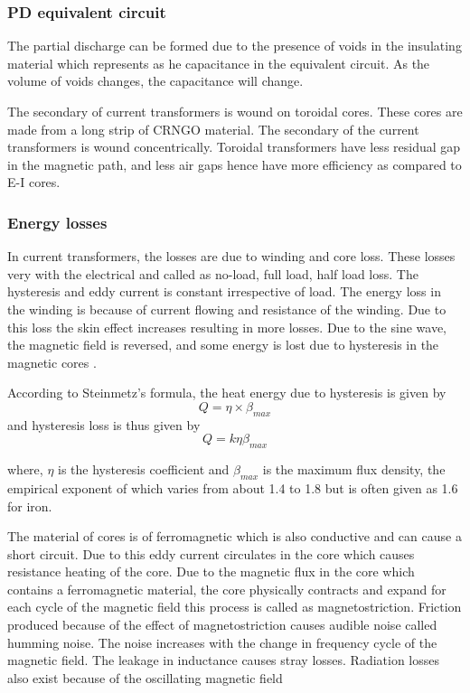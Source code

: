 \subsubsection{PD equivalent circuit }
The partial discharge can be formed due to the presence of voids in the insulating material which represents as he capacitance in the equivalent circuit. As the volume of voids changes, the capacitance will change\setlength{\parskip}{1em}.

The secondary of current transformers is wound on toroidal cores. These cores are made from a long strip of CRNGO material. The secondary of the current transformers is wound concentrically. Toroidal transformers have less residual gap in the magnetic path, and less air gaps hence have more efficiency as compared to E-I cores\setlength{\parskip}{0em}. 

\subsubsection{Energy losses}
In current transformers, the losses are due to winding and core loss. These losses very with the electrical and called as no-load, full load, half load loss. The hysteresis and eddy current is constant irrespective of load. The energy loss in the winding is because of current flowing and resistance of the winding. Due to this loss the skin effect increases resulting in more losses. Due to the sine wave, the magnetic field is reversed, and some energy is lost due to hysteresis in the magnetic cores \setlength{\parskip}{1em} \cite{iec200060270, haraldsen1968investigations, berent1995acoustic}.

According to Steinmetz's formula, the heat energy due to hysteresis is given by
\begin{equation}
 Q = \eta \times \beta_{max}
\end{equation}
and hysteresis loss is thus given by
\begin{equation}
 Q = k \eta \beta_{max}
\end{equation}

where, $\eta$ is the hysteresis coefficient and $\beta_{max}$ is the maximum flux density, the empirical exponent of which varies from about 1.4 to 1.8 but is often given as 1.6 for iron.

The material of cores is of ferromagnetic which is also conductive and can cause a short circuit. Due to this eddy current circulates in the core which causes resistance heating of the core. Due to the magnetic flux in the core which contains a ferromagnetic material, the core physically contracts and expand for each cycle of the magnetic field this process is called as magnetostriction. Friction produced because of the effect of magnetostriction causes audible noise called humming noise. The noise increases with the change in frequency cycle of the magnetic field. The leakage in inductance causes stray losses. Radiation losses also exist because of the oscillating magnetic field \setlength{\parskip}{0em} \cite{shertukde1998detection, moore1997application}

